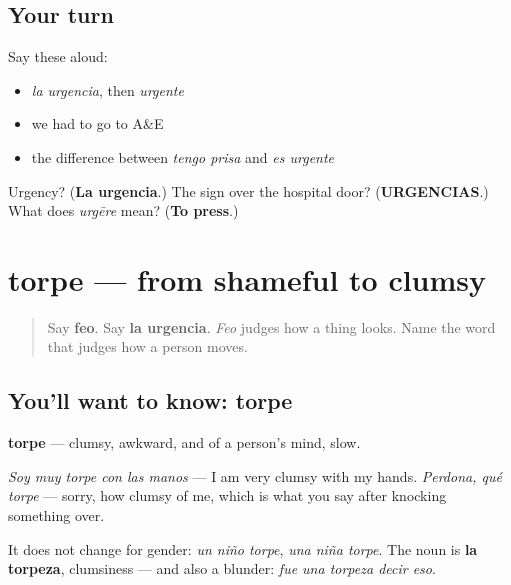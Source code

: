 \subsection*{Your turn}
Say these aloud:

\begin{itemize}
\raggedright
  \item \emph{la urgencia}, then \emph{urgente}
  \item we had to go to A\&E
  \item the difference between \emph{tengo prisa} and \emph{es urgente}
\end{itemize}

\begin{tcolorbox}[breakable,colback=teal!4,colframe=teal!35!black,title={Before you move on}]
Urgency? (\textbf{La urgencia}.) The sign over the hospital door? (\textbf{URGENCIAS}.) What does \emph{urgēre} mean? (\textbf{To press}.)
\end{tcolorbox}
\section[torpe]{torpe — from shameful to clumsy}

\label{lesson:ES-C447-torpe}



\begin{quote}
Say \textbf{feo}. Say \textbf{la urgencia}. \emph{Feo} judges how a thing looks. Name the word that judges how a person moves.
\end{quote}

\subsection*{You'll want to know: torpe}
\textbf{torpe} — clumsy, awkward, and of a person's mind, slow.

\emph{Soy muy torpe con las manos} — I am very clumsy with my hands. \emph{Perdona, qué torpe} — sorry, how clumsy of me, which is what you say after knocking something over.

It does not change for gender: \emph{un niño torpe}, \emph{una niña torpe}. The noun is \textbf{la torpeza}, clumsiness — and also a blunder: \emph{fue una torpeza decir eso}.

